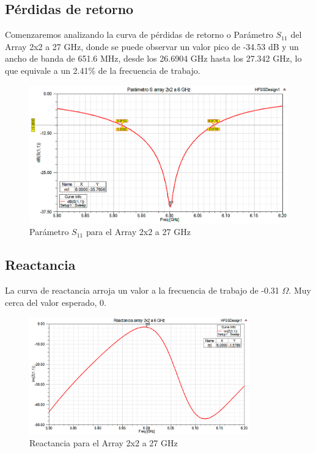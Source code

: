 \subsection{Pérdidas de retorno}
\par Comenzaremos analizando la curva de pérdidas de retorno o Parámetro $S_{11}$ del Array 2x2 a 27 GHz, donde se puede observar un valor pico de -34.53 dB y un ancho de banda de 651.6 MHz, desde los 26.6904 GHz hasta los 27.342 GHz, lo que equivale a un 2.41\% de la frecuencia de trabajo.
\\
\begin{figure}[H]
    \centering
        \includegraphics[width=\textwidth]{archivos/analisis/2x23/1}
        \caption{Parámetro $S_{11}$ para el Array 2x2 a 27 GHz}
        \label{fig:s2x23}
\end{figure}

\subsection{Reactancia}
\par La curva de reactancia arroja un valor a la frecuencia de trabajo de -0.31 $\Omega$. Muy cerca del valor esperado, 0.
\\
\begin{figure}[H]
    \centering
        \includegraphics[width=0.85\textwidth]{archivos/analisis/2x23/2}
        \caption{Reactancia para el Array 2x2 a 27 GHz}
        \label{fig:react2x23}
\end{figure}


